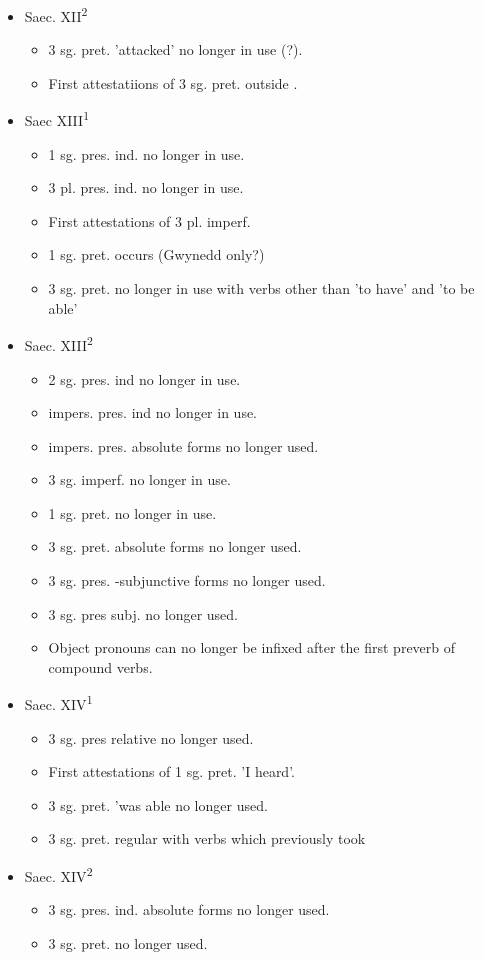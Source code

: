 \begin{itemize}
\item Saec. XII\textsuperscript{2}
    \begin{itemize}
    \item 3 sg. pret.  'attacked' no longer in use (?).
    \item First attestatiions of 3 sg. pret.  outside .
    \end{itemize}
\item Saec XIII\textsuperscript{1}
    \begin{itemize}
    \item 1 sg. pres. ind.  no longer in use.
    \item 3 pl. pres. ind.  no longer in use.
    \item First attestations of 3 pl. imperf. 
    \item 1 sg. pret.  occurs (Gwynedd only?)
    \item 3 sg. pret.  no longer in use with verbs other than  'to have' and  'to be able'
    \end{itemize}
\item Saec. XIII\textsuperscript{2}
    \begin{itemize}
    \item 2 sg. pres. ind  no longer in use.
    \item impers. pres. ind  no longer in use.
    \item impers. pres. absolute forms no longer used.
    \item 3 sg. imperf.  no longer in use.
    \item 1 sg. pret.  no longer in use.
    \item 3 sg. pret. absolute forms no longer used.
    \item 3 sg. pres. -subjunctive forms no longer used.
    \item 3 sg. pres subj.  no longer used.
    \item Object pronouns can no longer be infixed after the first preverb of compound verbs.
    \end{itemize}
\item Saec. XIV\textsuperscript{1}
    \begin{itemize}
    \item 3 sg. pres relative  no longer used.
    \item First attestations of 1 sg. pret.  'I heard'. 
    \item 3 sg. pret.  'was able  no longer used.
    \item 3 sg. pret.  regular with verbs which previously took 
    \end{itemize}
\item Saec. XIV\textsuperscript{2}
    \begin{itemize}
    \item 3 sg. pres. ind. absolute forms no longer used.
    \item 3 sg. pret.  no longer used.
    \end{itemize}
\end{itemize}

